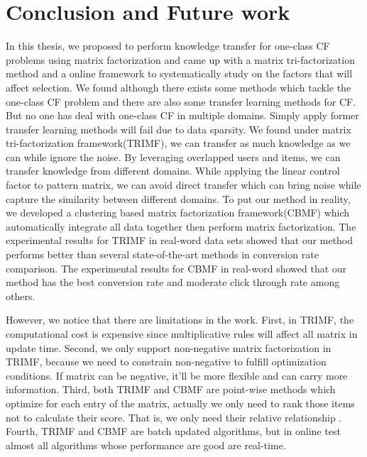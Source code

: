 \chapter{Conclusion and Future work}
\label{chp:conclusion}

In this thesis, we proposed to perform knowledge transfer for one-class CF problems using matrix factorization and came up with a matrix tri-factorization method and a online framework to systematically study on the factors that will affect selection.
We found although there exists some methods which tackle the one-class CF problem and there are also some transfer learning methods for CF. But no one has deal with one-class CF in multiple domains. Simply apply former transfer learning methods will fail due to data sparsity. 
We found under matrix tri-factorization framework(TRIMF), we can transfer as much knowledge as we can while ignore the noise. 
By leveraging overlapped users and items, we can transfer knowledge from different domains. While applying the linear control factor to pattern matrix, we can avoid direct transfer which can bring noise while capture the similarity between different domains.
To put our method in reality, we developed a clustering based matrix factorization framework(CBMF) which automatically integrate all data together then perform matrix factorization.
The experimental results for TRIMF in real-word data sets showed that our method performs better than several state-of-the-art methods in conversion rate comparison.
The experimental results for CBMF in real-word showed that our method has the best conversion rate and moderate click through rate among others.
 
However, we notice that there are limitations in the work. First, in TRIMF, the computational cost is expensive since multiplicative rules will affect all matrix in update time. Second, we only support non-negative matrix factorization in TRIMF, because we need to constrain non-negative to fulfill optimization conditions. If matrix can be negative, it'll be more flexible and can carry more information. Third, both TRIMF and CBMF are point-wise methods which optimize for each entry of the matrix, actually we only need to rank those items not to calculate their score. That is, we only need their relative relationship \cite{Rendle:2009:BBP:1795114.1795167}. Fourth, TRIMF and CBMF are batch updated algorithms, but in online test almost all algorithms whose performance are good are real-time.


